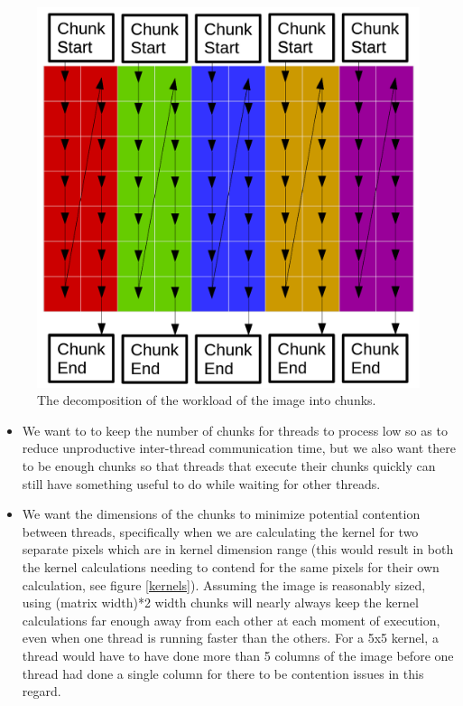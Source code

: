 \documentclass[paper=a4, fontsize=11pt]{scrartcl} %
\numberwithin{equation}{section} %
\numberwithin{figure}{section} %
\numberwithin{table}{section} %
\begin{document}
\begin{figure}[H]
	\centering
	\includegraphics[scale=0.25]{"Chunks"}
	\caption{The decomposition of the workload of the image into chunks.}
        \label{chunks}
\end{figure}

\begin{itemize}
\item We want to to keep the number of chunks for threads to process low so as to reduce unproductive inter-thread communication time, but we also want there to be enough chunks so that threads that execute their chunks quickly can still have something useful to do while waiting for other threads.
\item We want the dimensions of the chunks to minimize potential contention between threads, specifically when we are calculating the kernel for two separate pixels which are in kernel dimension range (this would result in both the kernel calculations needing to contend for the same pixels for their own calculation, see figure \ref{kernels}). Assuming the image is reasonably sized, using (matrix width)*2 width chunks will nearly always keep the kernel calculations far enough away from each other at each moment of execution, even when one thread is running faster than the others. For a 5x5 kernel, a thread would have to have done more than 5 columns of the image before one thread had done a single column for there to be contention issues in this regard.
\end{itemize}
\end{document}

